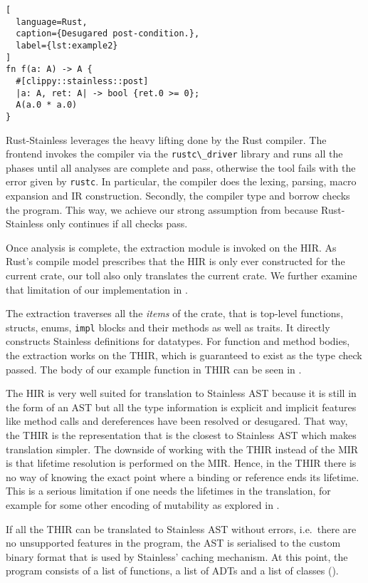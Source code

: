 \begin{lstlisting}[
  language=Rust,
  caption={Desugared post-condition.},
  label={lst:example2}
]
fn f(a: A) -> A {
  #[clippy::stainless::post]
  |a: A, ret: A| -> bool {ret.0 >= 0};
  A(a.0 * a.0)
}
\end{lstlisting}

Rust-Stainless leverages the heavy lifting done by the Rust compiler. The
frontend invokes the compiler via the \passthrough{\lstinline!rustc\_driver!}
library and runs all the phases until all analyses are complete and pass,
otherwise the tool fails with the error given by
\passthrough{\lstinline!rustc!}. In particular, the compiler does the lexing,
parsing, macro expansion and IR construction. Secondly, the compiler type and
borrow checks the program. This way, we achieve our strong assumption from
 because Rust-Stainless only continues if all checks
pass.

Once analysis is complete, the extraction module is invoked on the HIR.
As Rust's compile model prescribes that the HIR is only ever constructed
for the current crate, our toll also only translates the current crate.
We further examine that limitation of our implementation in .

The extraction traverses all the \emph{items} of the crate, that is top-level
functions, structs, enums, \passthrough{\lstinline!impl!} blocks and their
methods as well as traits. It directly constructs Stainless definitions for
datatypes. For function and method bodies, the extraction works on the THIR,
which is guaranteed to exist as the type check passed. The body of our example
function in THIR can be seen in .

The HIR is very well suited for translation to Stainless AST because it is still
in the form of an AST but all the type information is explicit and implicit
features like method calls and dereferences have been resolved or desugared.
That way, the THIR is the representation that is the closest to Stainless AST
which makes translation simpler. The downside of working with the THIR instead
of the MIR is that lifetime resolution is performed on the MIR. Hence, in the
THIR there is no way of knowing the exact point where a binding or reference
ends its lifetime. This is a serious limitation if one needs the lifetimes in
the translation, for example for some other encoding of mutability as explored
in .


If all the THIR can be translated to Stainless AST without errors,
i.e.~there are no unsupported features in the program, the AST is
serialised to the custom binary format that is used by Stainless'
caching mechanism. At this point, the program consists of a list of
functions, a list of ADTs and a list of classes ().

